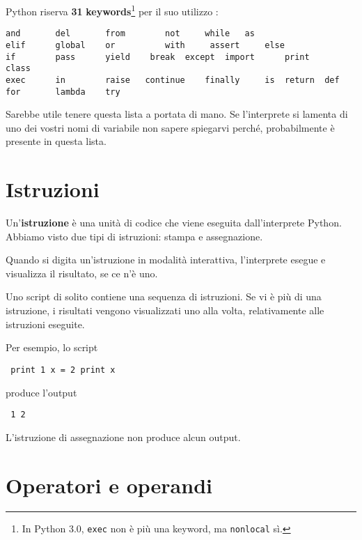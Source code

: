  

Python riserva \textbf{31} \textbf{keywords}\footnote{	 In Python
3.0, {\tt exec} non \`{e} pi\`{u} una  keyword, ma  {\tt nonlocal}
s\`{i}.} \textbf{ }per il suo utilizzo :

\beforeverb \begin{verbatim} 
and       del       from	 	not	 	while 	as        
elif      global    or	 	 	with 	 assert 	else     
if        pass      yield 	 break	except 	import   	print		class    
exec      in        raise  	continue  	finally 	is	return	def      
for       lambda    try \end{verbatim} \afterverb
%
Sarebbe utile tenere questa lista a portata di mano. Se l'interprete si
lamenta di uno dei vostri nomi di variabile non sapere spiegarvi
perch\'{e}, probabilmente \`{e} presente in questa lista.

\section{Istruzioni}

Un'\textbf{istruzione }\`{e} una unit\`{a} di codice che viene eseguita
dall'interprete Python. Abbiamo visto due tipi di istruzioni: stampa e
assegnazione.

  

Quando si digita un'istruzione in modalit\`{a} interattiva, l'interprete
esegue e visualizza il risultato, se ce n'\`{e} uno.

Uno script di solito contiene una sequenza di istruzioni. Se vi \`{e}
pi\`{u} di una istruzione, i risultati vengono visualizzati uno alla
volta, relativamente alle istruzioni eseguite.


Per esempio, lo script

\beforeverb \begin{verbatim} print 1 x = 2 print x \end{verbatim}
\afterverb
%
produce l'output

\beforeverb \begin{verbatim} 1 2 \end{verbatim} \afterverb
%
L'istruzione di assegnazione non produce alcun output.


\section{Operatori e operandi} 
  

